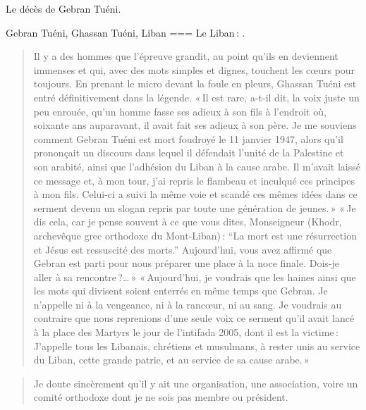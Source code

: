 Le décès de Gebran Tuéni.

Gebran Tuéni, Ghassan Tuéni, Liban
===
Le Liban : .

\begin{quote}
    Il y a des hommes que l’épreuve grandit, au point qu’ils en deviennent immenses et qui, avec des mots simples et dignes, touchent les cœurs pour toujours. En prenant le micro devant la foule en pleurs, Ghassan Tuéni est entré définitivement dans la légende. « Il est rare, a-t-il dit, la voix juste un peu enrouée, qu’un homme fasse ses adieux à son fils à l’endroit où, soixante ans auparavant, il avait fait ses adieux à son père. Je me souviens comment Gebran Tuéni est mort foudroyé le 11 janvier 1947, alors qu’il prononçait un discours dans lequel il défendait l’unité de la Palestine et son arabité, ainsi que l’adhésion du Liban à la cause arabe. Il m’avait laissé ce message et, à mon tour, j’ai repris le flambeau et inculqué ces principes à mon fils. Celui-ci a suivi la même voie et scandé ces mêmes idées dans ce serment devenu un slogan repris par toute une génération de jeunes. » « Je dis cela, car je pense souvent à ce que vous dites, Monseigneur (Khodr, archevêque grec orthodoxe du Mont-Liban) : “La mort est une résurrection et Jésus est ressuscité des morts.” Aujourd’hui, vous avez affirmé que Gebran est parti pour nous préparer une place à la noce finale. Dois-je aller à sa rencontre ?… » « Aujourd’hui, je voudrais que les haines ainsi que les mots qui divisent soient enterrés en même temps que Gebran. Je n’appelle ni à la vengeance, ni à la rancœur, ni au sang. Je voudrais au contraire que nous reprenions d’une seule voix ce serment qu’il avait lancé à la place des Martyrs le jour de l’intifada 2005, dont il est la victime : J’appelle tous les Libanais, chrétiens et musulmans, à rester unis au service du Liban, cette grande patrie, et au service de sa cause arabe. »
\end{quote}
\nocite{2005b}

\begin{quote}
Je doute sincèrement qu’il y ait une organisation, une association, voire un comité orthodoxe dont je ne sois pas membre ou président.
\end{quote}

